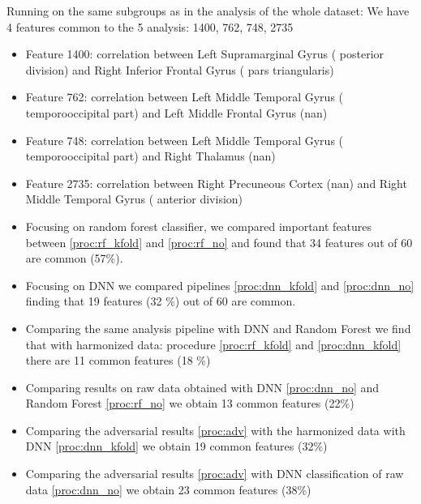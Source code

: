 \documentclass[11pt]{report}
\begin{document}
Running on the same subgroups as in the analysis of the whole dataset:
We have 4 features common to the 5 analysis: 1400, 762, 748, 2735
\begin{itemize}
\item Feature 1400: correlation between Left Supramarginal Gyrus ( posterior division) and Right Inferior Frontal Gyrus ( pars triangularis)
\item Feature 762: correlation between Left Middle Temporal Gyrus ( temporooccipital part) and Left Middle Frontal Gyrus (nan)
\item Feature 748: correlation between Left Middle Temporal Gyrus ( temporooccipital part) and Right Thalamus (nan)
\item Feature 2735: correlation between Right Precuneous Cortex (nan) and Right Middle Temporal Gyrus ( anterior division)
\end{itemize}


\begin{itemize}
\item Focusing on random forest classifier, we compared important features between \ref{proc:rf_kfold} and \ref{proc:rf_no} and found that 34 features out of 60 are common (57\%).
\item Focusing on DNN we compared pipelines \ref{proc:dnn_kfold} and \ref{proc:dnn_no} finding that 19 features (32 \%) out of 60 are common.
\item Comparing the same analysis pipeline with DNN and Random Forest we find that with harmonized data: procedure \ref{proc:rf_kfold} and \ref{proc:dnn_kfold} there are 11 common features (18 \%)
\item Comparing results on raw data obtained with DNN \ref{proc:dnn_no} and Random Forest \ref{proc:rf_no} we obtain 13 common features  (22\%)
\item Comparing the adversarial results \ref{proc:adv} with the harmonized data with DNN \ref{proc:dnn_kfold} we obtain 19 common features (32\%)
\item Comparing the adversarial results \ref{proc:adv} with DNN classification of raw data \ref{proc:dnn_no} we obtain 23 common features (38\%)
\end{itemize}








\end{document}
